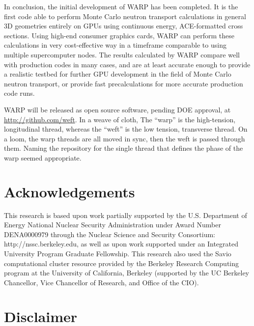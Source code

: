 \documentclass[preprint,12pt]{elsarticle}
\begin{document}
In conclusion, the initial development of WARP has been completed.  It is the first code able to perform Monte Carlo neutron transport calculations in general 3D geometries entirely on GPUs using continuous energy, ACE-formatted cross sections.  Using high-end consumer graphics cards, WARP can perform these calculations in very cost-effective way in a timeframe comparable to using multiple supercomputer nodes.  The results calculated by WARP compare well with production codes in many cases, and are at least accurate enough to provide a realistic testbed for further GPU development in the field of Monte Carlo neutron transport, or provide fast precalculations for more accurate production code runs.


WARP will be released as open source software, pending DOE approval, at \url{http://github.com/weft}.  In a weave of cloth, The ``warp'' is the high-tension, longitudinal thread, whereas the ``weft'' is the low tension, transverse thread.  On a loom, the warp threads are all moved in sync, then the weft is passed through them.  Naming the repository for the single thread that defines the phase of the warp seemed appropriate.

\section*{Acknowledgements}
\label{sec:ack}

This research is based upon work partially supported by the U.S. Department of Energy National Nuclear Security Administration under Award Number DENA0000979 through the Nuclear Science and Security Consortium: http://nssc.berkeley.edu, as well as upon work supported under an Integrated University Program Graduate Fellowship.  This research also used the Savio computational cluster resource provided by the Berkeley Research Computing program at the University of California, Berkeley (supported by the UC Berkeley Chancellor, Vice Chancellor of Research, and Office of the CIO).

\section*{Disclaimer}
\label{sec:disclaim}
\end{document}
